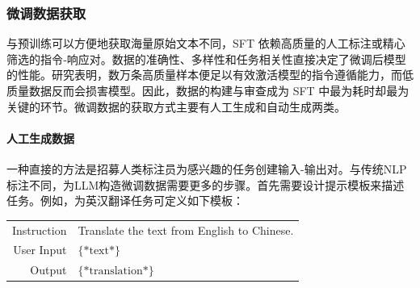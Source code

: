 

\subsubsection{微调数据获取}

\noindent 与预训练可以方便地获取海量原始文本不同，SFT 依赖高质量的人工标注或精心筛选的指令‑响应对。数据的准确性、多样性和任务相关性直接决定了微调后模型的性能。研究表明，数万条高质量样本便足以有效激活模型的指令遵循能力，而低质量数据反而会损害模型。因此，数据的构建与审查成为 SFT 中最为耗时却最为关键的环节。微调数据的获取方式主要有人工生成和自动生成两类。

\paragraph{人工生成数据}

一种直接的方法是招募人类标注员为感兴趣的任务创建输入-输出对。与传统NLP标注不同，为LLM构造微调数据需要更多的步骤。首先需要设计提示模板来描述任务。例如，为英汉翻译任务可定义如下模板：

\vspace{0.5em}
\begin{tcolorbox}
\begingroup
\renewcommand{\arraystretch}{1.0}
\setlength{\tabcolsep}{6pt}
\begin{tabular}{r l}
{\color{gray} \small{Instruction}} & Translate the text from English to Chinese. \\ [0.2cm]
{\color{gray} \small{User Input}} & $\{*\mathrm{text}*\}$  \\ [0.2cm]
{\color{gray} \small{Output}} & \underline{$\{*\mathrm{translation}*\}$}
\end{tabular}
\endgroup
\end{tcolorbox}
\vspace{0.5em}

